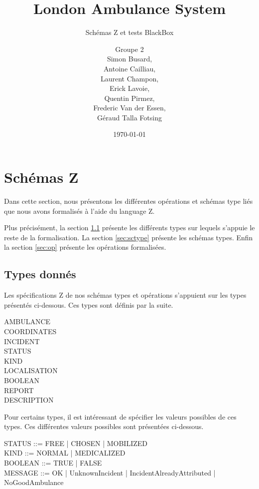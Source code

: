 \documentclass{report}
\title{London Ambulance System}
\subtitle{Schémas Z et tests BlackBox}
\author{\normalsize{Groupe 2}\\
\footnotesize{
Simon Busard, \\
Antoine Cailliau, \\
Laurent Champon,\\
Erick Lavoie, \\
Quentin Pirmez,\\
Frederic Van der Essen, \\
Géraud Talla Fotsing}}
\date{\today}
\begin{document}
\setlength{\parskip}{1em}
\startdocument

\maketitle
\setcounter{tocdepth}{1}
\tableofcontents

\chapter{Schémas Z}

Dans cette section, nous présentons les différentes opérations et
schémas type liés que nous avons formalisés à l'aide du language Z.

Plus précisément, la section \ref{sec:type} présente les différents
types sur lequels s'appuie le reste de la formalisation. La section
\ref{sec:sctype} présente les schémas types. Enfin la section
\ref{sec:op} présente les opérations formalisées.

\section{Types donnés}\label{sec:type}
Les spécifications Z de nos schémas types et 
opérations s'appuient sur les types présentés ci-dessous. Ces types sont
définis par la suite.
\begin{zed}
AMBULANCE \\
COORDINATES \\
INCIDENT \\
STATUS  \\
KIND \\
LOCALISATION \\
BOOLEAN \\
REPORT  \\
DESCRIPTION
\end{zed}

Pour certains types, il est intéressant de spécifier les valeurs 
possibles de ces types. Ces différentes valeurs possibles sont présentées
ci-dessous.
\begin{syntax}
STATUS ::= FREE | CHOSEN | MOBILIZED \\
KIND ::= NORMAL | MEDICALIZED \\
BOOLEAN ::= TRUE  | FALSE \\
MESSAGE ::= OK | UnknownIncident | IncidentAlreadyAttributed | NoGoodAmbulance
\end{syntax}
\end{document}
